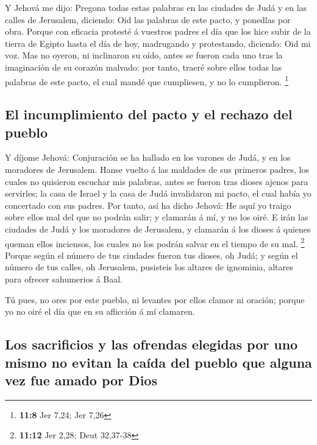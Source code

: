  Y Jehová me dijo: Pregona todas estas palabras en las
ciudades de Judá y en las calles de Jerusalem, diciendo: Oid las
palabras de este pacto, y ponedlas por obra.  Porque con
eficacia protesté á vuestros padres el día que los hice subir de la
tierra de Egipto hasta el día de hoy, madrugando y protestando,
diciendo: Oid mi voz.  Mas no oyeron, ni inclinaron su oído,
antes se fueron cada uno tras la imaginación de su corazón malvado: por
tanto, traeré sobre ellos todas las palabras de este pacto, el cual
mandé que cumpliesen, y no lo cumplieron. \footnote{\textbf{11:8} Jer
  7,24; Jer 7,26}

\hypertarget{el-incumplimiento-del-pacto-y-el-rechazo-del-pueblo}{%
\subsection{El incumplimiento del pacto y el rechazo del
pueblo}\label{el-incumplimiento-del-pacto-y-el-rechazo-del-pueblo}}

 Y díjome Jehová: Conjuración se ha hallado en los varones
de Judá, y en los moradores de Jerusalem.  Hanse vuelto á
las maldades de sus primeros padres, los cuales no quisieron escuchar
mis palabras, antes se fueron tras dioses ajenos para servirles; la casa
de Israel y la casa de Judá invalidaron mi pacto, el cual había yo
concertado con sus padres.  Por tanto, así ha dicho Jehová:
He aquí yo traigo sobre ellos mal del que no podrán salir; y clamarán á
mí, y no los oiré.  E irán las ciudades de Judá y los
moradores de Jerusalem, y clamarán á los dioses á quienes queman ellos
inciensos, los cuales no los podrán salvar en el tiempo de su mal.
\footnote{\textbf{11:12} Jer 2,28; Deut 32,37-38}  Porque
según el número de tus ciudades fueron tus dioses, oh Judá; y según el
número de tus calles, oh Jerusalem, pusisteis los altares de ignominia,
altares para ofrecer sahumerios á Baal.

 Tú pues, no ores por este pueblo, ni levantes por ellos
clamor ni oración; porque yo no oiré el día que en su aflicción á mí
clamaren.

\hypertarget{los-sacrificios-y-las-ofrendas-elegidas-por-uno-mismo-no-evitan-la-cauxedda-del-pueblo-que-alguna-vez-fue-amado-por-dios}{%
\subsection{Los sacrificios y las ofrendas elegidas por uno mismo no
evitan la caída del pueblo que alguna vez fue amado por
Dios}\label{los-sacrificios-y-las-ofrendas-elegidas-por-uno-mismo-no-evitan-la-cauxedda-del-pueblo-que-alguna-vez-fue-amado-por-dios}}

